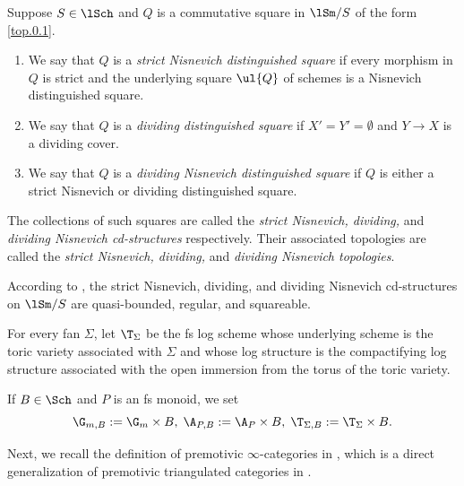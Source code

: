 \documentclass[10pt]{amsart}
\begin{document}
\begin{exm}
Suppose $S\in \lSch$ and $Q$ is a commutative square in $\lSm/S$ of the form \eqref{top.0.1}.
\begin{enumerate}
\item[(i)] We say that $Q$ is a \emph{strict Nisnevich distinguished square} if every morphism in $Q$ is strict and the underlying square  $\ul{Q}$ of schemes is a Nisnevich distinguished square.
\item[(ii)] We say that $Q$ is a \emph{dividing distinguished square} if $X'=Y'=\emptyset$ and $Y\to X$ is a dividing cover.
\item[(iii)] We say that $Q$ is a \emph{dividing Nisnevich distinguished square} if $Q$ is either a strict Nisnevich or dividing distinguished square.
\end{enumerate}

The collections of such squares are called the \emph{strict Nisnevich, dividing,} and \emph{dividing Nisnevich cd-structures} respectively.
Their associated topologies are called the \emph{strict Nisnevich, dividing,} and \emph{dividing Nisnevich topologies}.

According to \cite[Proposition 3.3.30]{logDM}, the strict Nisnevich, dividing, and dividing Nisnevich cd-structures on $\lSm/S$ are quasi-bounded, regular, and squareable.
\end{exm}

\begin{df}
For every fan $\Sigma$, let $\T_\Sigma$ be the fs log scheme whose underlying scheme is the toric variety associated with $\Sigma$ and whose log structure is the compactifying log structure associated with the open immersion from the torus of the toric variety.

If $B\in \Sch$ and $P$ is an fs monoid, we set
\[
\G_{m,B}:=\G_m\times B,
\;
\A_{P,B}:=\A_P\times B,
\;
\T_{\Sigma,B}:=\T_{\Sigma}\times B.
\]
\end{df}


Next, we recall the definition of premotivic $\infty$-categories in \cite{logSH}, which is a direct generalization of premotivic triangulated categories in \cite{CD19}.
\end{document}
